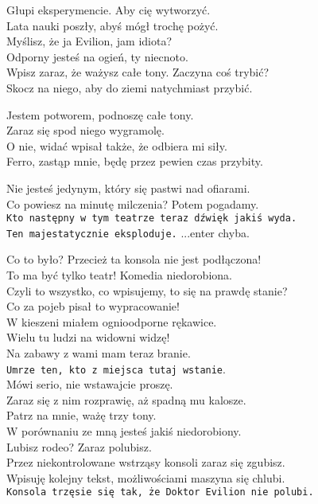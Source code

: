 \chardok{}
Głupi eksperymencie. Aby cię wytworzyć.\\
Lata nauki poszły, abyś mógł trochę pożyć.\\
Myślisz, że ja Evilion, jam idiota?\\
Odporny jesteś na ogień, ty niecnoto.\\
Wpisz zaraz, że ważysz całe tony. Zaczyna coś trybić?\\
Skocz na niego, aby do ziemi natychmiast przybić.\\


\charmik{}
Jestem potworem, podnoszę całe tony.\\
Zaraz się spod niego wygramolę.\\
O nie, widać wpisał także, że odbiera mi siły.\\
Ferro, zastąp mnie, będę przez pewien czas przybity.\\


\charfer{}
Nie jesteś jedynym, który się pastwi nad ofiarami.\\
Co powiesz na minutę milczenia? Potem pogadamy.\\
\texttt{Kto następny w tym teatrze teraz dźwięk jakiś wyda.\\
Ten majestatycznie eksploduje.} ...enter chyba.\\


\charfer{}
Co to było? Przecież ta konsola nie jest podłączona!\\
To ma być tylko teatr! Komedia niedorobiona.\\
Czyli to wszystko, co wpisujemy, to się na prawdę stanie?\\
Co za pojeb pisał to wypracowanie!\\

\chardok{}
W kieszeni miałem ognioodporne rękawice.\\
Wielu tu ludzi na widowni widzę!\\
Na zabawy z wami mam teraz branie.\\
\texttt{Umrze ten, kto z miejsca tutaj wstanie}.\\

\charfer{}
Mówi serio, nie wstawajcie proszę.\\
Zaraz się z nim rozprawię, aż spadną mu kalosze.\\
Patrz na mnie, ważę trzy tony.\\
W porównaniu ze mną jesteś jakiś niedorobiony.\\
Lubisz rodeo? Zaraz polubisz.\\
Przez niekontrolowane wstrząsy konsoli zaraz się zgubisz.\\
Wpisuję kolejny tekst, możliwościami maszyna się chlubi.\\
\texttt{Konsola trzęsie się tak, że Doktor Evilion nie polubi.}\\

